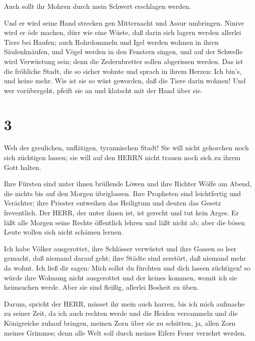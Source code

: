  Auch sollt ihr Mohren durch mein Schwert erschlagen
werden.

 Und er wird seine Hand strecken gen Mitternacht und Assur
umbringen. Ninive wird er öde machen, dürr wie eine Wüste, 
daß darin sich lagern werden allerlei Tiere bei Haufen; auch Rohrdommeln
und Igel werden wohnen in ihren Säulenknäufen, und Vögel werden in den
Fenstern singen, und auf der Schwelle wird Verwüstung sein; denn die
Zedernbretter sollen abgerissen werden.  Das ist die
fröhliche Stadt, die so sicher wohnte und sprach in ihrem Herzen: Ich
bin's, und keine mehr. Wie ist sie so wüst geworden, daß die Tiere darin
wohnen! Und wer vorübergeht, pfeift sie an und klatscht mit der Hand
über sie.

\hypertarget{section-2}{%
\section{3}\label{section-2}}

 Weh der greulichen, unflätigen, tyrannischen Stadt!
 Sie will nicht gehorchen noch sich züchtigen lassen; sie
will auf den HERRN nicht trauen noch sich zu ihrem Gott halten.

 Ihre Fürsten sind unter ihnen brüllende Löwen und ihre
Richter Wölfe am Abend, die nichts bis auf den Morgen übriglassen.
 Ihre Propheten sind leichtfertig und Verächter; ihre
Priester entweihen das Heiligtum und deuten das Gesetz freventlich.
 Der HERR, der unter ihnen ist, ist gerecht und tut kein
Arges. Er läßt alle Morgen seine Rechte öffentlich lehren und läßt nicht
ab; aber die bösen Leute wollen sich nicht schämen lernen.

 Ich habe Völker ausgerottet, ihre Schlösser verwüstet und
ihre Gassen so leer gemacht, daß niemand darauf geht; ihre Städte sind
zerstört, daß niemand mehr da wohnt.  Ich ließ dir sagen:
Mich sollst du fürchten und dich lassen züchtigen! so würde ihre Wohnung
nicht ausgerottet und der keines kommen, womit ich sie heimsuchen werde.
Aber sie sind fleißig, allerlei Bosheit zu üben.

 Darum, spricht der HERR, müsset ihr mein auch harren, bis
ich mich aufmache zu seiner Zeit, da ich auch rechten werde und die
Heiden versammeln und die Königreiche zuhauf bringen, meinen Zorn über
sie zu schütten, ja, allen Zorn meines Grimmes; denn alle Welt soll
durch meines Eifers Feuer verzehrt werden.

